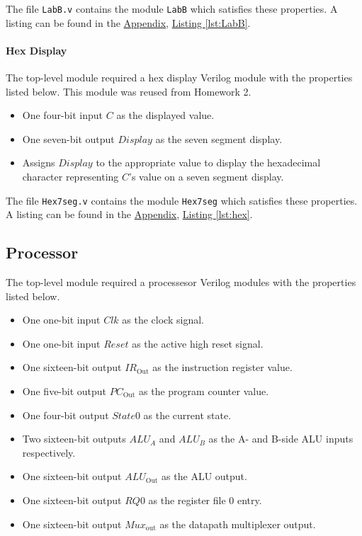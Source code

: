 The file \verb|LabB.v| contains the module \verb|LabB| which satisfies these properties.
A listing can be found in the \hyperref[sec:appendix]{Appendix}, \hyperref[lst:LabB]{Listing \ref*{lst:LabB}}.

\paragraph{Hex Display} \label{par:hex}

The top-level module required a hex display Verilog module with the properties listed below.
This module was reused from Homework 2.

\begin{itemize}
    \item One four-bit input $C$ as the displayed value.
    \item One seven-bit output $Display$ as the seven segment display.
    \item Assigns $Display$ to the appropriate value to display the hexadecimal character representing $C$'s value on a seven segment display.
\end{itemize}

The file \verb|Hex7seg.v| contains the module \verb|Hex7seg| which satisfies these properties.
A listing can be found in the \hyperref[sec:appendix]{Appendix}, \hyperref[lst:hex]{Listing \ref*{lst:hex}}.

\subsection{Processor}  \label{subsec:processor}

The top-level module required a processesor Verilog modules with the properties listed below.

\begin{itemize}
    \item One one-bit input $Clk$ as the clock signal.
    \item One one-bit input $Reset$ as the active high reset signal.
    \item One sixteen-bit output $IR_\text{Out}$ as the instruction register value.
    \item One five-bit output $PC_\text{Out}$ as the program counter value.
    \item One four-bit output $State0$ as the current state.
    \item Two sixteen-bit outputs $ALU_A$ and $ALU_B$ as the A- and B-side ALU inputs respectively.
    \item One sixteen-bit output $ALU_\text{Out}$ as the ALU output.
    \item One sixteen-bit output $RQ0$ as the register file 0 entry.
    \item One sixteen-bit output $Mux_\text{out}$ as the datapath multiplexer output.
\end{itemize}


